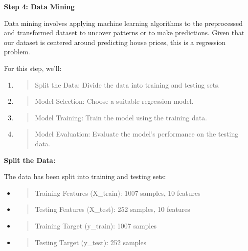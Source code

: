 \documentclass[]{article}
\newcommand{\textcenter}[1]{\begin{center} \vspace{10px}\textbf{\large #1} \end{center}}
\begin{document}
\textcenter{Step 4: Data Mining}

Data mining involves applying machine learning algorithms to the
preprocessed and transformed dataset to uncover patterns or to make
predictions. Given that our dataset is centered around predicting house
prices, this is a regression problem.

For this step, we'll:

\begin{enumerate}
\def\labelenumi{\arabic{enumi}.}
\item
  \begin{quote}
  Split the Data: Divide the data into training and testing sets.
  \end{quote}
\item
  \begin{quote}
  Model Selection: Choose a suitable regression model.
  \end{quote}
\item
  \begin{quote}
  Model Training: Train the model using the training data.
  \end{quote}
\item
  \begin{quote}
  Model Evaluation: Evaluate the model's performance on the testing
  data.
  \end{quote}
\end{enumerate}

\textbf{Split the Data:}

The data has been split into training and testing sets:

\begin{itemize}
\item
  \begin{quote}
  Training Features (X\_train): 1007 samples, 10 features
  \end{quote}
\item
  \begin{quote}
  Testing Features (X\_test): 252 samples, 10 features
  \end{quote}
\item
  \begin{quote}
  Training Target (y\_train): 1007 samples
  \end{quote}
\item
  \begin{quote}
  Testing Target (y\_test): 252 samples
  \end{quote}
\end{itemize}
\end{document}
